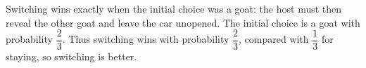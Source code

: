 Switching wins exactly when the initial choice was a goat: the host must then reveal the other goat and leave the car unopened. The initial choice is a goat with probability $\dfrac{2}{3}$. Thus switching wins with probability $\boxed{\dfrac{2}{3}}$, compared with $\dfrac{1}{3}$ for staying, so switching is better.
